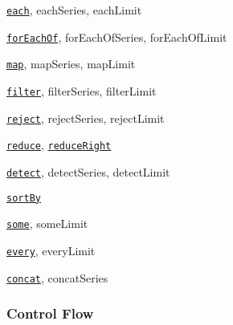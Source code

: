 \begin{DoxyItemize}
\item \href{#each}{\tt {\ttfamily each}}, {\ttfamily each\+Series}, {\ttfamily each\+Limit}
\item \href{#forEachOf}{\tt {\ttfamily for\+Each\+Of}}, {\ttfamily for\+Each\+Of\+Series}, {\ttfamily for\+Each\+Of\+Limit}
\item \href{#map}{\tt {\ttfamily map}}, {\ttfamily map\+Series}, {\ttfamily map\+Limit}
\item \href{#filter}{\tt {\ttfamily filter}}, {\ttfamily filter\+Series}, {\ttfamily filter\+Limit}
\item \href{#reject}{\tt {\ttfamily reject}}, {\ttfamily reject\+Series}, {\ttfamily reject\+Limit}
\item \href{#reduce}{\tt {\ttfamily reduce}}, \href{#reduceRight}{\tt {\ttfamily reduce\+Right}}
\item \href{#detect}{\tt {\ttfamily detect}}, {\ttfamily detect\+Series}, {\ttfamily detect\+Limit}
\item \href{#sortBy}{\tt {\ttfamily sort\+By}}
\item \href{#some}{\tt {\ttfamily some}}, {\ttfamily some\+Limit}
\item \href{#every}{\tt {\ttfamily every}}, {\ttfamily every\+Limit}
\item \href{#concat}{\tt {\ttfamily concat}}, {\ttfamily concat\+Series}
\end{DoxyItemize}

\subsubsection*{Control Flow}


